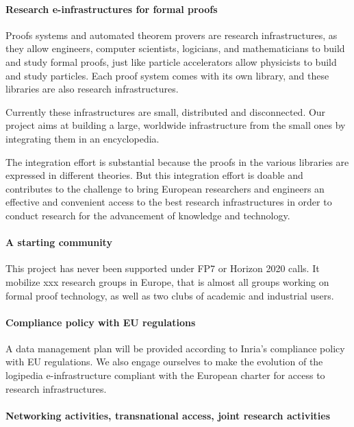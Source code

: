 \paragraph{Research e-infrastructures for formal proofs}

Proofs systems and automated theorem provers are research
infrastructures, as they allow engineers, computer scientists, logicians, and
mathematicians to build and study formal proofs, just like particle
accelerators allow physicists to build and study particles. Each proof
system comes with its own library, and these libraries are also
research infrastructures.

Currently these infrastructures are small, distributed and
disconnected.  Our project aims at building a large, worldwide
infrastructure from the small ones by integrating them in an
encyclopedia.

The integration effort is substantial because the proofs in the
various libraries are expressed in different theories. But this
integration effort is doable and contributes to the challenge to bring
European researchers and engineers an effective and convenient access
to the best research infrastructures in order to conduct research for
the advancement of knowledge and technology.

\paragraph{A starting community}

This project has never been supported under FP7 or Horizon 2020 calls.
It mobilize xxx research groups in Europe, that is almost all groups
working on formal proof technology, as well as two clubs of academic
and industrial users.

\paragraph{Compliance policy with EU regulations}

A data management plan will be provided according to Inria’s
compliance policy with EU regulations. We also engage ourselves to
make the evolution of the logipedia e-infrastructure compliant with
the European charter for access to research infrastructures.

\paragraph{Networking activities, transnational access, joint research activities}

